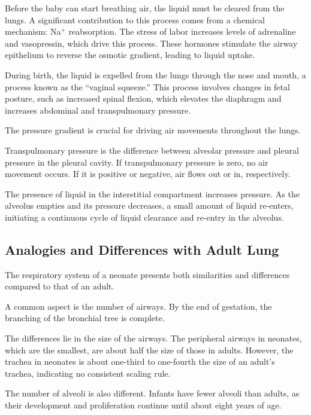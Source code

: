 Before the baby can start breathing air, the liquid must be cleared
from the lungs. A significant contribution to this process comes from
a chemical mechanism: Na$^{\text{+}}$ reabsorption. The stress of
labor increases levels of adrenaline and vasopressin, which drive this
process. These hormones stimulate the airway epithelium to reverse the
osmotic gradient, leading to liquid uptake.

During birth, the liquid is expelled from the lungs through the nose
and mouth, a process known as the ``vaginal squeeze.'' This process
involves changes in fetal posture, such as increased spinal flexion,
which elevates the diaphragm and increases abdominal and
transpulmonary pressure.

The pressure gradient is crucial for driving air movements throughout
the lungs.

Transpulmonary pressure is the difference between alveolar pressure
and pleural pressure in the pleural cavity. If transpulmonary pressure
is zero, no air movement occurs. If it is positive or negative, air
flows out or in, respectively.

The presence of liquid in the interstitial compartment increases
pressure. As the alveolus empties and its pressure decreases, a small
amount of liquid re-enters, initiating a continuous cycle of liquid
clearance and re-entry in the alveolus.

\subsection{Analogies and Differences with Adult Lung}
\label{subsec:analogies_and_differences}

The respiratory system of a neonate presents both similarities and
differences compared to that of an adult.

A common aspect is the number of airways. By the end of gestation, the
branching of the bronchial tree is complete.

The differences lie in the size of the airways. The peripheral airways
in neonates, which are the smallest, are about half the size of those
in adults. However, the trachea in neonates is about one-third to
one-fourth the size of an adult's trachea, indicating no consistent
scaling rule.

The number of alveoli is also different. Infants have fewer alveoli
than adults, as their development and proliferation continue until
about eight years of age\cite{avery1973}.

